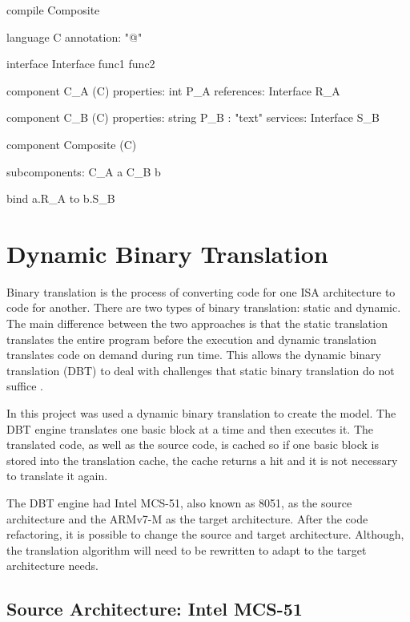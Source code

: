\documentclass[11pt]{report}
\begin{document}
		\begin{EL}
		compile Composite

		language C {
			annotation: "@"
		}
		
		interface Interface {
			func1 func2
		}
		
		component C_A (C) {
			properties:
				int P_A
			references:
				Interface R_A
		}
		
		component C_B (C) {
			properties:
				string P_B : "text"
			services:
				Interface S_B
		}
		
		component Composite (C) {
			subcomponents:
				C_A a
				C_B b
			
			bind a.R_A to b.S_B
		}
		\end{EL} 			
			
	\section{Dynamic Binary Translation}
	\par Binary translation is the process of converting code for one ISA architecture to code for another. There are two types of binary translation: static and dynamic. The main difference between the two approaches is that the static translation translates the entire program before the execution and dynamic translation translates code on demand during run time. This allows the dynamic binary translation (DBT) to deal with challenges that static binary translation do not suffice \cite{b.hawkingsb.demskyd.brueningq.zhao2015}. 
	\par In this project was used a dynamic binary translation to create the model. The DBT engine translates one basic block at a time and then executes it. The translated code, as well as the source code, is cached so if one basic block is stored into the translation cache, the cache returns a hit and it is not necessary to translate it again. 
	\par The DBT engine had Intel MCS-51, also known as 8051, as the source architecture and the ARMv7-M as the target architecture. After the code refactoring, it is possible to change the source and target architecture. Although, the translation algorithm will need to be rewritten to adapt to the target architecture needs.
	
		\subsection{Source Architecture: Intel MCS-51}
		
\end{document}
